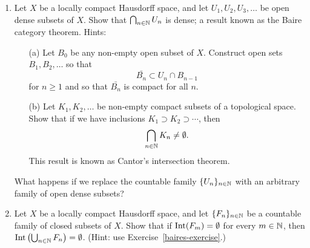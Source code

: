 \begin{enumerate}[label=3.\arabic*]
    \item \label{baires-exercise} Let $X$ be a locally compact Hausdorff space, and let $U_1, U_2, U_3, \dots$ be open dense subsets of $X$. Show that $\bigcap_{n \in \mathbb{N}} U_n$ is dense; a result known as the Baire category theorem. Hints:
      \begin{itemize}
        \item[(a)] Let $B_0$ be any non-empty open subset of $X$. Construct open sets $B_1, B_2, \dots$ so that
          \[
            \bar{B_n} \subset U_n \cap B_{n-1}
          \]
          for $n \geq 1$ and so that $\bar{B_n}$ is compact for all $n$.
        \item[(b)] Let $K_1, K_2, \dots$ be non-empty compact subsets of a topological space. Show that if we have inclusions $K_1 \supset K_2 \supset \cdots$, then
          \[
            \bigcap_{n \in \mathbb{N}} K_n \not= \emptyset.
          \]
          This result is known as Cantor's intersection theorem.
      \end{itemize}
      What happens if we replace the countable family $\{U_n\}_{n \in \mathbb{N}}$ with an arbitrary family of open dense subsets?
    \item Let $X$ be a locally compact Hausdorff space, and let $\{F_n\}_{n \in \mathbb{N}}$ be a countable family of closed subsets of $X$. Show that if $\operatorname{Int}(F_m) = \emptyset$ for every $m \in \mathbb{N}$, then $\operatorname{Int}\left(\bigcup_{n \in \mathbb{N}} F_n\right) = \emptyset$. (Hint: use Exercise~\ref{baires-exercise}.)
  \end{enumerate}
  
